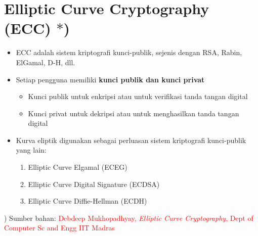 \documentclass{article}
\begin{document}

\section*{Elliptic Curve Cryptography (ECC) $\ast$)}

\begin{itemize}
    \item ECC adalah sistem kriptografi kunci-publik, sejenis dengan RSA, Rabin, ElGamal, D-H, dll.
    \item Setiap pengguna memiliki \textbf{kunci publik dan kunci privat}
    \begin{itemize}
        \item Kunci publik untuk enkripsi atau untuk verifikasi tanda tangan digital
        \item Kunci privat untuk dekripsi atau untuk menghasilkan tanda tangan digital
    \end{itemize}
    \item Kurva eliptik digunakan sebagai perluasan sistem kriptografi kunci-publik yang lain:
    \begin{enumerate}
        \item Elliptic Curve Elgamal (ECEG)
        \item Elliptic Curve Digital Signature (ECDSA)
        \item Elliptic Curve Diffie-Hellman (ECDH)
    \end{enumerate}
\end{itemize}

\vspace{10mm}

\textcolor{red}{\ast}) Sumber bahan: \textcolor{red}{Debdeep Mukhopadhyay, \textit{Elliptic Curve Cryptography}, Dept of Computer Sc and Engg IIT Madras}
\end{document}
